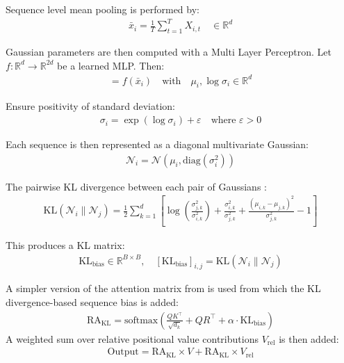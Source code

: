 \documentclass{article} %
\begin{document}
Sequence level mean pooling is performed by:
\begin{align}
\bar{x}_i = \frac{1}{T} \sum_{t=1}^{T} X_{i,t} \quad \in \mathbb{R}^{d}
\end{align}

Gaussian parameters are then computed with a Multi Layer Perceptron.
Let \( f: \mathbb{R}^{d} \rightarrow \mathbb{R}^{2d} \) be a learned MLP.
Then:
\begin{align}
[\mu_i, \log \sigma_i] = f(\bar{x}_i)
\quad \text{with} \quad 
\mu_i, \log \sigma_i \in \mathbb{R}^{d}
\end{align}

Ensure positivity of standard deviation:
\begin{align}
\sigma_i = \exp(\log \sigma_i) + \varepsilon
\quad \text{where } \varepsilon > 0
\end{align}

Each sequence is then represented as a diagonal multivariate Gaussian:
\begin{align}
\mathcal{N}_i = \mathcal{N}(\mu_i, \mathrm{diag}(\sigma_i^2))
\end{align}

The pairwise KL divergence between each pair of Gaussians \citep{kldiv}:
\begin{align}
\label{eq:kldiv}
\text{KL}(\mathcal{N}_i \parallel \mathcal{N}_j) =
\frac{1}{2} \sum_{k=1}^{d} \left[
\log\left( \frac{\sigma_{j,k}^2}{\sigma_{i,k}^2} \right) +
\frac{\sigma_{i,k}^2}{\sigma_{j,k}^2} +
\frac{(\mu_{i,k} - \mu_{j,k})^2}{\sigma_{j,k}^2} - 1
\right]
\end{align}

This produces a KL matrix:
\begin{align}
\text{KL}_{\text{bias}} \in \mathbb{R}^{B \times B}, \quad
[\text{KL}_{\text{bias}}]_{i,j} = \text{KL}(\mathcal{N}_i \parallel \mathcal{N}_j)
\end{align}

A simpler version of the attention matrix from \citet{XL} is used from which the KL divergence-based sequence bias is added:
\begin{align}
\text{RA}_{\text{KL}} = \text{softmax} \left( \frac{Q K^\top}{\sqrt{d_k}} + Q R^\top + \alpha \cdot \text{KL}_{\text{bias}} \right)
\end{align}
A weighted sum over relative positional value contributions $V_{\text{rel}}$ is then added:
\begin{align}
\text{Output} = \text{RA}_{\text{KL}} \times V + \text{RA}_{\text{KL}} \times V_{\text{rel}}
\end{align}
\end{document}
